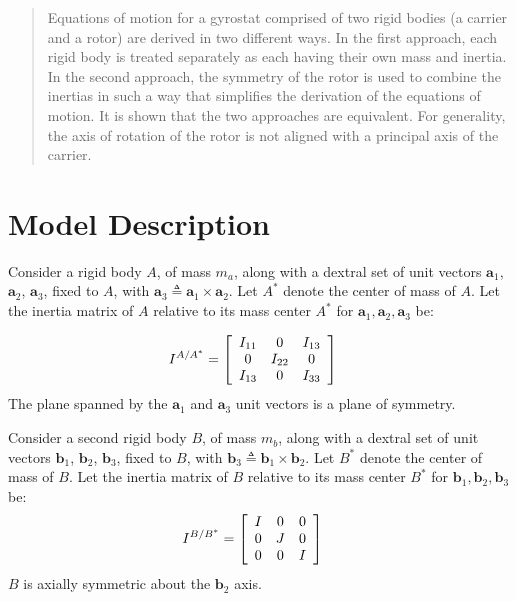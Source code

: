 \documentclass[letterpaper,11pt]{article}
\newcommand{\bs}[1]{ \boldsymbol{ #1 } }
\begin{document}
\begin{abstract}
  Equations of motion for a gyrostat comprised of two rigid bodies (a carrier and
  a rotor) are derived in two different ways.  In the first approach, each
  rigid body is treated separately as each having their own mass and
  inertia.  In the second approach, the symmetry of the rotor is used to
  combine the inertias in such a way that simplifies the derivation of the
  equations of motion.  It is shown that the two approaches are equivalent.
  For generality, the axis of rotation of the rotor is not aligned with a
  principal axis of the carrier.
\end{abstract}

\section*{Model Description}

Consider a rigid body $A$, of mass $m_a$, along with a dextral set of unit
vectors $\bs{a}_1$, $\bs{a}_2$, $\bs{a}_3$, fixed to $A$, with $\bs{a}_3
\triangleq \bs{a}_1 \times \bs{a}_2$.  Let $A^*$ denote the center of mass of
$A$.  Let the inertia matrix of $A$ relative to its mass center $A^*$ for
$\bs{a}_1, \bs{a}_2, \bs{a}_3$ be:

\begin{align*}
  I^{A/A^*} & =
    \left[ \begin{array}{c c c}
      I_{11} & 0 & I_{13} \\
      0 & I_{22} & 0 \\
      I_{13} & 0 & I_{33}
    \end{array} \right]
\end{align*}
The plane spanned by the $\bs{a}_1$ and $\bs{a}_3$ unit vectors is a plane of
symmetry.

Consider a second rigid body $B$, of mass $m_b$, along with a dextral set of unit
vectors $\bs{b}_1$, $\bs{b}_2$, $\bs{b}_3$, fixed to $B$, with $\bs{b}_3
\triangleq \bs{b}_1 \times \bs{b}_2$.  Let $B^*$ denote the center of mass of
$B$.  Let the inertia matrix of $B$ relative to its mass center  $B^*$ for
$\bs{b}_1, \bs{b}_2, \bs{b}_3$ be:
\begin{align*}
  I^{B/B^*} & =
    \left[ \begin{array}{c c c}
      I & 0 & 0 \\
      0 & J & 0 \\
      0 & 0 & I
    \end{array} \right]
\end{align*}
$B$ is axially symmetric about the $\bs{b}_2$ axis.
\end{document}

